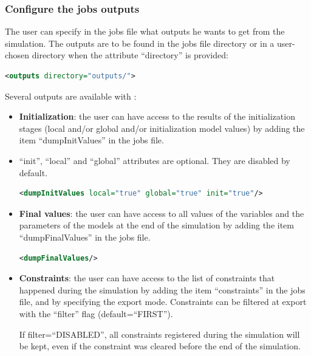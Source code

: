 \documentclass[a4paper, 12pt]{report}
\begin{document}
\subsubsection{Configure the jobs outputs}
\label{sec:Configure the jobs outputs}

The user can specify in the jobs file what outputs he wants to get from the simulation. The outputs are to be found in the jobs file directory or in a user-chosen directory when the attribute ``directory'' is provided:

\begin{lstlisting}[language=XML,numbers=none]
<outputs directory="outputs/">
\end{lstlisting}

Several outputs are available with \Dynawo:
\begin{itemize}
\item \textbf{Initialization}: the user can have access to the results of the initialization stages (local and/or global and/or initialization model values) by adding the item ``dumpInitValues'' in the jobs file.
\item ``init'', ``local'' and ``global'' attributes are optional. They are disabled by default.

\begin{lstlisting}[language=XML, morekeywords={dumpInitValues},numbers=none]
<dumpInitValues local="true" global="true" init="true"/>
\end{lstlisting}

\item \textbf{Final values}: the user can have access to all values of the variables and the parameters of the models at the end of the simulation by adding the item ``dumpFinalValues'' in the jobs file.

\begin{lstlisting}[language=XML, morekeywords={dumpFinalValues},numbers=none]
<dumpFinalValues/>
\end{lstlisting}

\item \textbf{Constraints}: the user can have access to the list of constraints that happened during the simulation by adding the item ``constraints'' in the jobs file, and by specifying the export mode.
Constraints can be filtered at export with the ``filter'' flag (default=``FIRST'').

If filter=``DISABLED'', all constraints registered during the simulation will be kept, even if the constraint was cleared before the end of the simulation.


\end{itemize}
\end{document}

